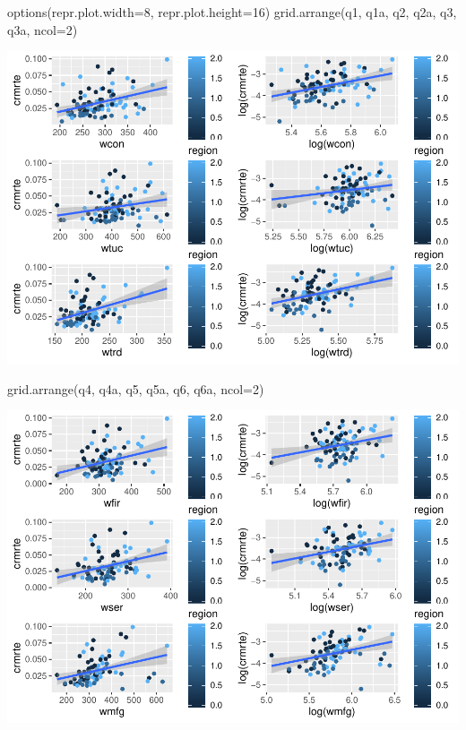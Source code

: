 \documentclass[]{article}
\newenvironment{Shaded}{}{}
\newcommand{\DataTypeTok}[1]{#1}
\newcommand{\DecValTok}[1]{#1}
\newcommand{\KeywordTok}[1]{\textcolor[rgb]{0.00,0.00,1.00}{#1}}
\newcommand{\NormalTok}[1]{#1}
\begin{document}
\begin{Shaded}
\begin{Highlighting}[]
\KeywordTok{options}\NormalTok{(}\DataTypeTok{repr.plot.width=}\DecValTok{8}\NormalTok{, }\DataTypeTok{repr.plot.height=}\DecValTok{16}\NormalTok{)}
\KeywordTok{grid.arrange}\NormalTok{(q1, q1a, q2, q2a, q3, q3a, }\DataTypeTok{ncol=}\DecValTok{2}\NormalTok{)}
\end{Highlighting}
\end{Shaded}

\includegraphics{Bagnard_Gaustad_Hartman_Leung_Lab_3_files/figure-latex/unnamed-chunk-50-1.pdf}

\begin{Shaded}
\begin{Highlighting}[]
\KeywordTok{grid.arrange}\NormalTok{(q4, q4a, q5, q5a, q6, q6a, }\DataTypeTok{ncol=}\DecValTok{2}\NormalTok{)}
\end{Highlighting}
\end{Shaded}

\includegraphics{Bagnard_Gaustad_Hartman_Leung_Lab_3_files/figure-latex/unnamed-chunk-50-2.pdf}
\end{document}
